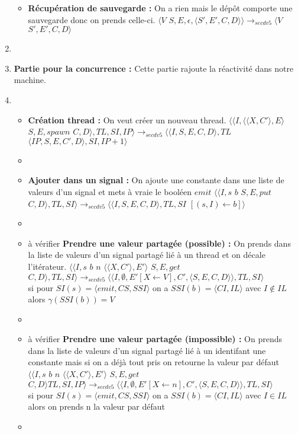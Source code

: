 \documentclass[10pt,a4paper]{article}
\begin{document}
\begin{enumerate}
\begin{itemize}
						\item[] \textbf{Récupération de sauvegarde :}  On a rien mais le dépôt comporte une sauvegarde donc on prends celle-ci.
						\smallbreak  
						$\langle V$ $S,E,\epsilon,\langle S',E',C,D\rangle\rangle
						\longrightarrow_{secdv5} 
						\langle V$ $S',E',C,D\rangle$
					\end{itemize}
					\item[]
					
					
					
					\item[] \textbf{Partie pour la concurrence :} Cette partie rajoute la réactivité dans notre machine. 
					\item[]
					\begin{itemize}
						\item[]  \textbf{Création thread :} On veut créer un nouveau thread.
						\smallbreak 
						$\langle\langle I,\langle\langle X,C'\rangle, E\rangle$ $S,E,spawn$ $C,D\rangle,TL,SI,IP\rangle 
						\longrightarrow_{secdv5} 
						\langle\langle I,S,E,C,D\rangle,TL$ $\langle IP,S,E,C',D\rangle,SI,IP+1\rangle$
						\item[]
						
						\item[] \textbf{Ajouter dans un signal :} On ajoute une constante dans une liste de valeurs d'un signal et mets à vraie le booléen $emit$
						\smallbreak
						$\langle\langle I,s$ $b$ $S,E,put$ $C,D\rangle,TL,SI\rangle
						\longrightarrow_{secdv5} 
						\langle\langle I,S,E,C,D\rangle,TL,SI$ $[(s,I) \leftarrow b]\rangle$ 
						\item[]
						
						\item[] à vérifier \textbf{Prendre une valeur partagée (possible) :} On prends dans la liste de valeurs d'un signal partagé lié à un thread et on décale l'itérateur.
						\smallbreak
						$\langle\langle I,s$ $b$ $n$ $\langle\langle X,C'\rangle,E'\rangle$ $S,E,get$ $C,D\rangle,TL,SI\rangle 
						\longrightarrow_{secdv5} 
						\langle\langle I,\emptyset,E'[X \leftarrow V],C',\langle S,E,C,D\rangle\rangle,TL,SI\rangle$
						\\ si pour $SI(s) = \langle emit,CS,SSI\rangle$ on a $SSI(b) = \langle CI,IL\rangle$ avec $I \notin IL$ alors $\gamma(SSI(b)) = V$
						\item[]
						
						\item[] à vérifier \textbf{Prendre une valeur partagée (impossible) :} On prends dans la liste de valeurs d'un signal partagé lié à un identifant une constante mais si on a déjà tout pris on retourne la valeur par défaut
						\smallbreak 
						$\langle\langle I,s$ $b$ $n$ $\langle\langle X,C'\rangle,E'\rangle$ $S,E,get$ $C,D\rangle TL,SI,IP\rangle 
						\longrightarrow_{secdv5} 
						\langle\langle I,\emptyset,E'[X \leftarrow n],C',\langle S,E,C,D\rangle\rangle,TL,SI\rangle$
						\\ si pour $SI(s) = \langle emit,CS,SSI\rangle$ on a $SSI(b) = \langle CI,IL\rangle$ avec $I \in IL$ alors on prends n la valeur par défaut
						\item[]
						

\end{itemize}
\end{enumerate}
\end{document}
